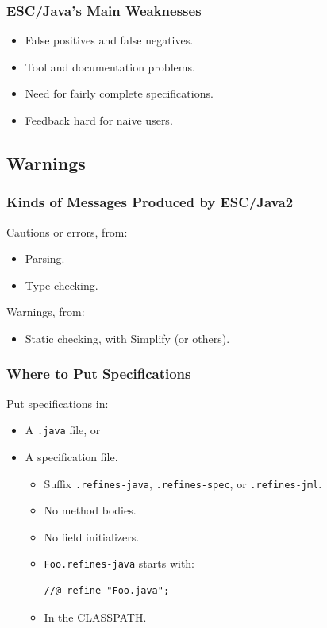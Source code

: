\begin{frame}
\frametitle{ESC/Java's Main Weaknesses}
\begin{itemize}
\item
False positives and false negatives.

\item
Tool and documentation problems.

\item
Need for fairly complete specifications.

\item
Feedback hard for naive users.
\end{itemize}
\end{frame}

\subsection{Warnings}

\begin{frame}
\frametitle{Kinds of Messages Produced by ESC/Java2}

Cautions or errors, from:
\begin{itemize}
\item
Parsing.

\item
Type checking.
\end{itemize}

Warnings, from:
\begin{itemize}
\item
Static checking, with Simplify (or others).
\end{itemize}
\end{frame}

\begin{frame}[fragile]
\frametitle{Where to Put Specifications}

Put specifications in:
\begin{itemize}
\item
A \texttt{.java} file, or

\item
A \alert{specification file}.
\begin{itemize}
\item
Suffix \texttt{.refines-java}, \texttt{.refines-spec}, or
\texttt{.refines-jml}.

\item
No method bodies.

\item
No field initializers.

\item
\texttt{Foo.refines-java} starts with:
\begin{lstlisting}
//@ refine "Foo.java";
\end{lstlisting}

\item
In the CLASSPATH.
\end{itemize}
\end{itemize}
\end{frame}

